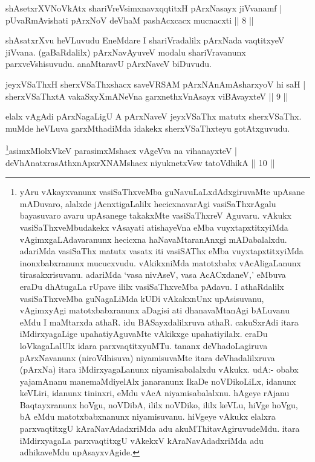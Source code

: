 
\begin{shl}
shAsetxrXVNoVkAtx shariVreV\s simxnavxqqtitxH pArxNasayx jiVvanamf | \\
pUvaRmAvishati pArxNoV deVhaM pashAcxcacx mucnacxti \hfill|| 8 || 
\end{shl}

\begin{artha} 
shAsatxrXvu heVLuvudu EneMdare I shariVradalilx pArxNada vaqtitxyeV 
jiVvana. (gaBaRdalilx) pArxNavAyuveV modalu shariVravanunx 
parxveVshisuvudu. anaMtaravU pArxNaveV biDuvudu.
\end{artha}

\begin{shl}
jeyxVSaThxH sherxVSaThxshacx saveVRSAM pArxNAnAmAsharxyoV hi saH | \\
sherxVSaThxtA vakaSxyXmANeVna garxnethxVnAsayx viBAvayxteV \hfill|| 9 || 
\end{shl}

\begin{artha} 
elalx vAgAdi pArxNagaLigU A pArxNaveV jeyxVSaThx matutx sherxVSaThx. 
muMde heVLuva garxMthadiMda idakekx sherxVSaThxteyu gotAtxguvudu.
\end{artha}


\begin{shl}
\footnote{yAru vAkayxvanunx vasiSaThxveMba guNavuLaLxdAdxgiruvaMte upAsane mADuvaro, alalxde jAcnxtigaLalilx hecicxnavarAgi vasiSaThxrAgalu bayasuvaro avaru upAsanege takakxMte vasiSaThxreV Aguvaru. vAkukx vasiSaThxveMbudakekx vAsayati atishayeVna eMba vuyxtapxtitxyiMda vAgimxgaLAdavaranunx hecicxna haNavaMtaranAnxgi mADabalalxdu. adariMda vasiSaThx matutx vasatx iti vasiSAThx eMba vuyxtapxtitxyiMda inonxbabxranunx mucucxvudu. vAkikxniMda matotxbabx vAcAligaLanunx tirasakxrisuvanu. adariMda `vasa nivAseV, vasa AcACxdaneV,' eMbuva eraDu dhAtugaLa rUpave ililx vasiSaThxveMba pAdavu. I athaRdalilx vasiSaThxveMba guNagaLiMda kUDi vAkakxnUnx upAsisuvanu, vAgimxyAgi matotxbabxranunx aDagisi ati dhanavaMtanAgi bALuvanu eMdu I maMtarxda athaR. idu BASayxdalilxruva athaR. cakuSxrAdi itara iMdirxyagaLige upahatiyAguvaMte vAkikxge upahatiyilalx. eraDu loVkagaLalUlx idara parxvaqtitxyuMTu. tananx deVhadoLagiruva pArxNavanunx (niroVdhisuva) niyamisuvaMte itara deVhadalilxruva (pArxNa) itara iMdirxyagaLanunx niyamisabalalxdu vAkukx. udA:- obabx yajamAnanu manemaMdiyelAlx janaranunx IkaDe noVDikoLiLx, idanunx keVLiri, idanunx tininxri, eMdu vAcA niyamisabalalxnu. hAgeye rAjanu Baqtayxranunx hoVgu, noVDibA, ililx noVDiko, ililx keVLu, hiVge hoVgu, bA eMdu matotxbabxnanunx niyamisuvanu. hiVgeye vAkukx elalxra parxvaqtitxgU kAraNavAdadxriMda adu akuMThitavAgiruvudeMdu. itara iMdirxyagaLa parxvaqtitxgU vAkekxV kAraNavAdadxriMda adu adhikaveMdu upAsayxvAgide.}asimxMlolxVkeV parasimxMshacx vAgeVva na vihanayxteV | \\
deVhAnatxrasAthxnApxrXNAMshacx niyuknetxV\s sw tatoV\s dhikA \hfill|| 10 || 
\end{shl}

